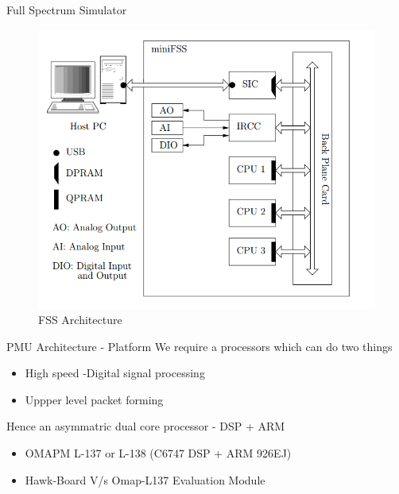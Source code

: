 \documentclass{beamer}
\begin{document}
\begin{frame}{Full Spectrum Simulator}
\begin{figure}
\includegraphics[scale=0.3]{fig/fss_arch2.png}
\caption{FSS Architecture}
\end{figure}
\end{frame}

\begin{frame}{PMU Architecture - Platform}
We require a processors which can do two things 
\begin{itemize}
\item High speed -Digital signal processing  
\item Uppper level packet forming
\end{itemize}
Hence an asymmatric dual core processor - DSP + ARM
\begin{itemize}
\item OMAPM L-137 or L-138 (C6747 DSP + ARM 926EJ)
\item Hawk-Board V/s Omap-L137 Evaluation Module
\end{itemize}
\end{frame}
\end{document}
